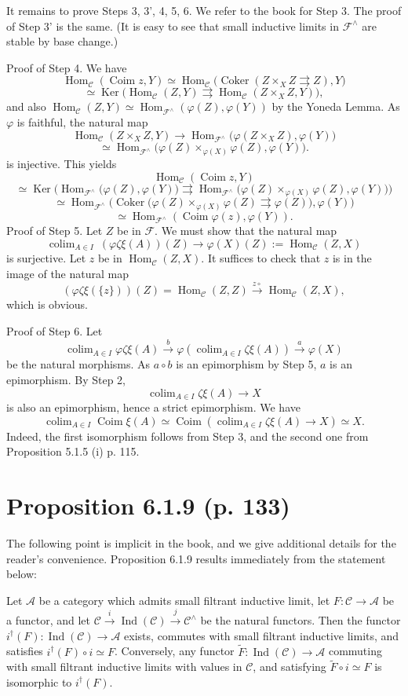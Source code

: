 \documentclass[12pt]{article}
\theoremstyle{remark}%
\newcommand{\n}{\noindent}
\newcommand{\A}{\mathcal A}
\newcommand{\C}{\mathcal C}
\newcommand{\F}{\mathcal F}
\newcommand{\p}{\varphi}
\DeclareMathOperator*{\coli}{colim}
\DeclareMathOperator{\Coim}{Coim}
\DeclareMathOperator{\Coker}{Coker}
\DeclareMathOperator{\Hom}{Hom}
\DeclareMathOperator{\Ind}{Ind}
\DeclareMathOperator{\Ker}{Ker}
\begin{document}
It remains to prove Steps 3, 3', 4, 5, 6. We refer to the book for Step 3. The proof of Step 3' is the same. (It is easy to see that small inductive limits in $\F^\wedge$ are stable by base change.) 

\n Proof of Step 4. We have 
$$
\Hom_\C(\Coim z,Y)\simeq\Hom_\C\big(\Coker(Z\times_XZ\rightrightarrows Z),Y\big)
$$
$$
\simeq\Ker\big(\Hom_\C(Z,Y)\rightrightarrows\Hom_\C(Z\times_XZ,Y)\big),
$$ 
and also $\Hom_\C(Z,Y)\simeq\Hom_{\F^\wedge}(\p(Z),\p(Y))$ by the Yoneda Lemma. As $\p$ is faithful, the natural map  
$$
\Hom_\C(Z\times_XZ,Y)\to\Hom_{\F^\wedge}\big(\p(Z\times_XZ),\p(Y)\big)
$$
$$
\simeq\Hom_{\F^\wedge}\big(\p(Z)\times_{\p(X)}\p(Z),\p(Y)\big).
$$ 
is injective. This yields 
$$
\Hom_\C(\Coim z,Y)
$$
$$
\simeq\Ker\Big(\Hom_{\F^\wedge}\big(\p(Z),\p(Y)\big)\rightrightarrows\Hom_{\F^\wedge}\big(\p(Z)\times_{\p(X)}\p(Z),\p(Y)\big)\Big)
$$
$$
\simeq\Hom_{\F^\wedge}\Big(\Coker\big(\p(Z)\times_{\p(X)}\p(Z)\rightrightarrows\p(Z)\big),\p(Y)\Big)
$$
$$
\simeq\Hom_{\F^\wedge}(\Coim\p(z),\p(Y)).
$$
Proof of Step 5. Let $Z$ be in $\F$. We must show that the natural map 
$$
\coli_{A\in I}\ (\p\zeta\xi(A))(Z)\to\p(X)(Z):=\Hom_\C(Z,X) 
$$
is surjective. Let $z$ be in $\Hom_\C(Z,X)$. It suffices to check that $z$ is in the image of the natural map 
$$
(\p\zeta\xi(\{z\}))(Z)=\Hom_\C(Z,Z)\xrightarrow{z\circ}\Hom_\C(Z,X),
$$
which is obvious. 

\n Proof of Step 6. Let 
$$
\coli_{A\in I}\p\zeta\xi(A)\xrightarrow{b}\p\left(\coli_{A\in I}\zeta\xi(A)\right)\xrightarrow{a}\p(X)
$$
be the natural morphisms. As $a\circ b$ is an epimorphism by Step 5, $a$ is an epimorphism. By Step 2, 
$$
\coli_{A\in I}\zeta\xi(A)\to X
$$ 
is also an epimorphism, hence a strict epimorphism. We have 
$$
\coli_{A\in I}\Coim\xi(A)\simeq\Coim\left(\coli_{A\in I}\zeta\xi(A)\to X\right)\simeq X.
$$ 
Indeed, the first isomorphism follows from Step 3, and the second one from Proposition 5.1.5 (i) p. 115. 
%
\section{Proposition 6.1.9 (p. 133)}\label{619}%
%
The following point is implicit in the book, and we give additional details for the reader's convenience. Proposition 6.1.9 results immediately from the statement below:

Let $\A$ be a category which admits small filtrant inductive limit, let $F:\C\to\A$ be a functor, and let $\C\overset{i}{\to}\Ind(\C)\overset{j}{\to}\C^\wedge$ be the natural functors. Then the functor $i^\dagger(F):\Ind(\C)\to\A$ exists, commutes with small filtrant inductive limits, and satisfies $i^\dagger(F)\circ i\simeq F$. Conversely, any functor $\widetilde F:\Ind(\C)\to\A$ commuting with small filtrant inductive limits with values in $\C$, and satisfying $\widetilde F\circ i\simeq F$ is isomorphic to $i^\dagger(F)$. 
\end{document}

